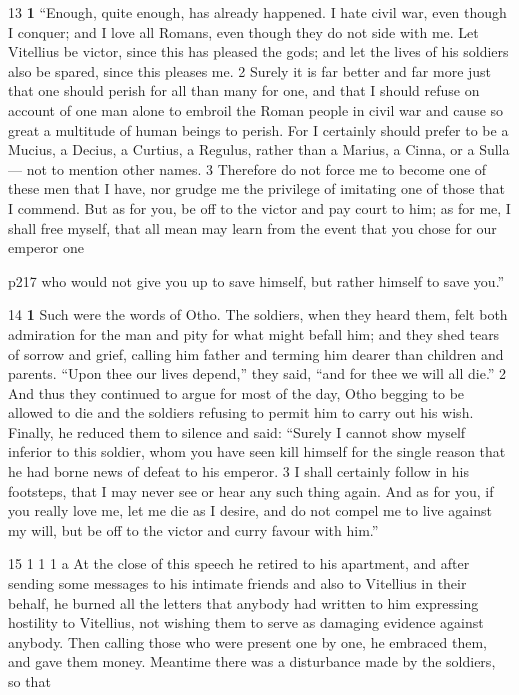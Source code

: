 13
\textbf{1} ``Enough, quite enough, has already happened. I hate civil war, even though I conquer; and I love all Romans, even though they do not side with me. Let Vitellius be victor, since this has pleased the gods; and let the lives of his soldiers also be spared, since this pleases me. 2 Surely it is far better and far more just that one should perish for all than many for one, and that I should refuse on account of one man alone to embroil the Roman people in civil war and cause so great a multitude of human beings to perish. For I certainly should prefer to be a Mucius, a Decius, a Curtius, a Regulus, rather than a Marius, a Cinna, or a Sulla \texthebrew{—} not to mention other names. 3 Therefore do not force me to become one of these men that I have, nor grudge me the privilege of imitating one of those that I commend. But as for you, be off to the victor and pay court to him; as for me, I shall free myself, that all mean may learn from the event that you chose for our emperor one

p217 who would not give you up to save himself, but rather himself to save you.''

14
\textbf{1} Such were the words of Otho. The soldiers, when they heard them, felt both admiration for the man and pity for what might befall him; and they shed tears of sorrow and grief, calling him father and terming him dearer than children and parents. ``Upon thee our lives depend,'' they said, ``and for thee we will all die.'' 2 And thus they continued to argue for most of the day, Otho begging to be allowed to die and the soldiers refusing to permit him to carry out his wish. Finally, he reduced them to silence and said: ``Surely I cannot show myself inferior to this soldier, whom you have seen kill himself for the single reason that he had borne news of defeat to his emperor. 3 I shall certainly follow in his footsteps, that I may never see or hear any such thing again. And as for you, if you really love me, let me die as I desire, and do not compel me to live against my will, but be off to the victor and curry favour with him.''

15
1 1
1 a At the close of this speech he retired to his apartment, and after sending some messages to his intimate friends and also to Vitellius in their behalf, he burned all the letters that anybody had written to him expressing hostility to Vitellius, not wishing them to serve as damaging evidence against anybody. Then calling those who were present one by one, he embraced them, and gave them money. Meantime there was a disturbance made by the soldiers, so that

